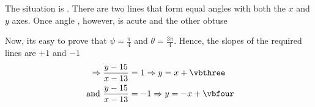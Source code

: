 \begin{solution}[\halfpage]
	The situation is \asif. There are two lines that form equal angles with both the $x$ and $y$ axes. Once angle ,
    however, is acute and the other obtuse
    
    Now, its easy to prove that $\psi = \frac{\pi}{4}$ and $\theta = \frac{3\pi}{4}$. Hence, the slopes of the 
    required lines are $+1$ and $-1$
    \begin{align}
    	\Rightarrow \dfrac{y-\vbtwo}{x-\vbone} &= 1 \Rightarrow y = x + \vbthree\\
    	\text{ and } \dfrac{y-\vbtwo}{x-\vbone} &= -1 \Rightarrow y = -x + \vbfour
    \end{align}
\end{solution}
